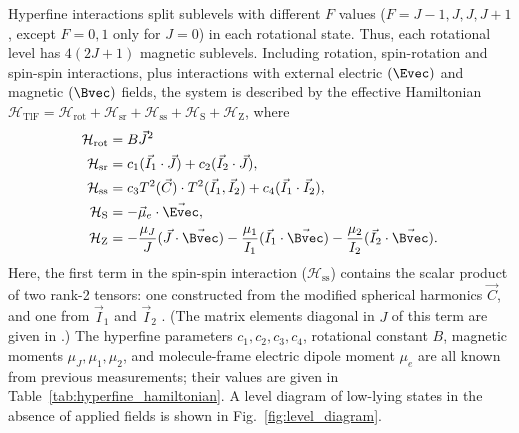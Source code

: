 Hyperfine interactions split sublevels with different $F$ values ($F=J-1,J,J, J+1$, except $F=0,1$ only for $J=0$) in each rotational state. Thus, each rotational level has $4(2J+1)$ magnetic sublevels. %
Including rotation, spin-rotation and spin-spin interactions, plus interactions with external electric $(\Evec)$ and magnetic $(\Bvec)$ fields, the system is described by the effective Hamiltonian \cite{wilkening1984search}
\small
$\mathcal{H}_\text{TlF} = \mathcal{H}_\text{rot}+\mathcal{H}_\text{sr}+\mathcal H_\text{ss} + \mathcal H_\text{S}+\mathcal H_\text{Z}$, 
\normalsize
where
\begin{equation} 
    \label{eq:hyperfine_hamiltonian}
    \begin{split}
        \mathcal H_\text{rot} & = B \vec{J}^2 \\
        \mathcal H_\text{sr}&=c_1(\vec I_1\cdot\vec J)+c_2(\vec I_2\cdot\vec J), \\
        \mathcal H_\text{ss}&=c_3 T^2(\vec C)\cdot T^2(\vec I_1, \vec I_2)+c_4(\vec I_1\cdot\vec I_2), \\
        \mathcal H_\text{S}&=-\vec\mu_e\cdot\vec \Evec,\\
        \mathcal H_\text{Z}&=-\frac{\mu_J}{J}(\vec J\cdot\vec \Bvec)-\frac{\mu_1}{I_1}(\vec I_1\cdot\vec \Bvec)-\frac{\mu_2}{I_2}(\vec I_2\cdot\vec \Bvec).
    \end{split}
\end{equation}
Here, the first term in the spin-spin interaction ($\mathcal H_\text{ss}$) contains the scalar product of two rank-2 tensors: one constructed from the modified spherical harmonics $\vec C$, and one from $\vec{I}_1$ and $\vec{I}_2$ \cite{brown2003rotational}. (The matrix elements diagonal in $J$ of this term are given in \cite{wilkening1984search}.)  The hyperfine parameters $c_1,c_2,c_3,c_4$, rotational constant $B$, magnetic moments $\mu_J,\mu_1,\mu_2$, and molecule-frame electric dipole moment $\mu_e$ are all known from previous measurements; their values are given in  Table~\ref{tab:hyperfine_hamiltonian}. A level diagram of low-lying states in the absence of applied fields is shown in Fig.~\ref{fig:level_diagram}.

